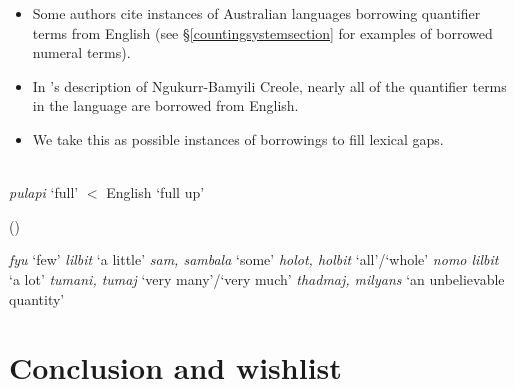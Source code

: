 \documentclass{article}
\begin{document}
\begin{itemize}
\item Some authors cite instances of Australian languages borrowing quantifier terms from English (see \S\ref{countingsystemsection} for examples of borrowed numeral terms).
\item In \cite{sandefur79}'s description of Ngukurr-Bamyili Creole, nearly all of the quantifier terms in the language are borrowed from English.
\item We take this as possible instances of borrowings to fill lexical gaps.
\end{itemize}

\begin{exe} 
 \\
{\it pulapi} `full' $<$ English `full up'

 (\citealt[100]{sandefur79})
\begin{xlist}
\ex \textit{fyu} `few'
\ex \textit{lilbit} `a little'
\ex \textit{sam, sambala} `some'
\ex \textit{holot, holbit} `all'/`whole'
\ex \textit{nomo lilbit} `a lot'
\ex \textit{tumani, tumaj} `very many'/`very much'
\ex \textit{thadmaj, milyans} `an unbelievable quantity'
\end{xlist}
\end{exe}

\section{Conclusion and wishlist}
\end{document}
